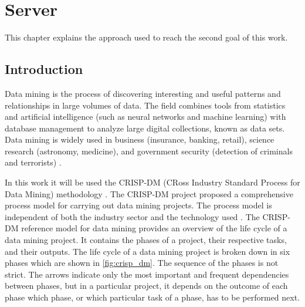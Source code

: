 % 
%  
%
\chapter{Server}
\label{cha:server}
This chapter explains the approach used to reach the second goal of this work. 

\section{Introduction} %
\label{sec:introduction}
Data mining is the process of discovering interesting and useful patterns and relationships in large volumes of data. The field combines tools from statistics and artificial intelligence (such as neural networks and machine learning) with database management to analyze large digital collections, known as data sets. Data mining is widely used in business (insurance, banking, retail), science research (astronomy, medicine), and government security (detection of criminals and terrorists) \cite{Okonkwo2011COMBATINGCA}. 

In this work it will be used the CRISP-DM (CRoss Industry Standard Process for Data Mining) methodology \cite{CRISPDM}.
The CRISP-DM project proposed a comprehensive process model for carrying out data mining projects. The process model is independent of both the industry sector and the technology used \cite{CRISPDM}. 
The CRISP-DM reference model for data mining provides an overview of the life cycle of a data
mining project. It contains the phases of a project, their respective tasks, and their outputs.
The life cycle of a data mining project is broken down in six phases which are shown in \ref{fig:crisp_dm}.
The sequence of the phases is not strict. The arrows indicate only the most important and frequent
dependencies between phases, but in a particular project, it depends on the outcome of each phase
which phase, or which particular task of a phase, has to be performed next.

